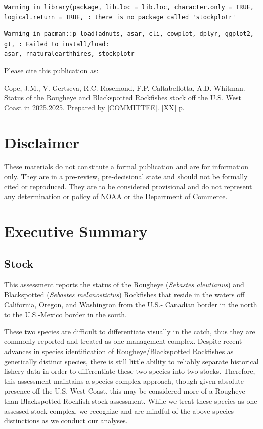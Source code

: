 \documentclass[
]{scrartcl}
\begin{document}
\begin{verbatim}
Warning in library(package, lib.loc = lib.loc, character.only = TRUE,
logical.return = TRUE, : there is no package called 'stockplotr'
\end{verbatim}

\begin{verbatim}
Warning in pacman::p_load(adnuts, asar, cli, cowplot, dplyr, ggplot2, gt, : Failed to install/load:
asar, rnaturalearthhires, stockplotr
\end{verbatim}

\newpage{}

Please cite this publication as:

Cope, J.M., V. Gertseva, R.C. Rosemond, F.P. Caltabellotta, A.D.
Whitman. Status of the Rougheye and Blackspotted Rockfishes stock off
the U.S. West Coast in 2025.2025. Prepared by {[}COMMITTEE{]}. {[}XX{]}
p.

\newpage{}

\section*{Disclaimer}\label{disclaimer}

These materials do not constitute a formal publication and are for
information only. They are in a pre-review, pre-decisional state and
should not be formally cited or reproduced. They are to be considered
provisional and do not represent any determination or policy of NOAA or
the Department of Commerce.

\newpage{}

\section{Executive Summary}\label{executive-summary}

\subsection{Stock}\label{stock}

This assessment reports the status of the Rougheye (\emph{Sebastes
aleutianus}) and Blackspotted (\emph{Sebastes melanostictus}) Rockfishes
that reside in the waters off California, Oregon, and Washington from
the U.S.- Canadian border in the north to the U.S.-Mexico border in the
south.

These two species are difficult to differentiate visually in the catch,
thus they are commonly reported and treated as one management complex.
Despite recent advances in species identification of
Rougheye/Blackspotted Rockfishes as genetically distinct species, there
is still little ability to reliably separate historical fishery data in
order to differentiate these two species into two stocks. Therefore,
this assessment maintains a species complex approach, though given
absolute presence off the U.S. West Coast, this may be considered more
of a Rougheye than Blackspotted Rockfish stock assessment. While we
treat these species as one assessed stock complex, we recognize and are
mindful of the above species distinctions as we conduct our analyses.
\end{document}
